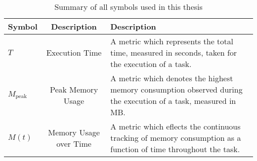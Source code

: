 
\newcommand{\T}{$T$}
\newcommand{\Mpeak}{$M_{\text{peak}}$}
\newcommand{\Mt}{$M(t)$}

\begin{table}[h]
    \centering
    \begin{tabular}{|l|c|p{5cm}|}
        \hline
        \textbf{Symbol} & \textbf{Description}   & \textbf{Description}                                                                                                \\ \hline
        \T              & Execution Time         & A metric which represents the total time, measured in seconds, taken for the execution of a task.                   \\ \hline
        \Mpeak          & Peak Memory Usage      & A metric which denotes the highest memory consumption observed during the execution of a task, measured in \ac{MB}. \\ \hline
        \Mt             & Memory Usage over Time & A metric which eflects the continuous tracking of memory consumption as a function of time throughout the task.     \\ \hline
    \end{tabular}
    \caption{Summary of all symbols used in this thesis}
    \label{tab:summary-of-symbols}
\end{table}